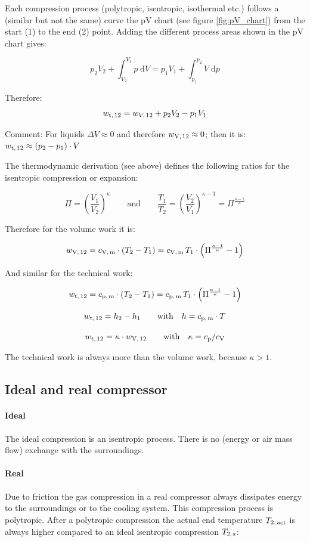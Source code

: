 \documentclass[11pt,a4paper,english,twoside]{scrreprt}
\begin{document}
Each compression process (polytropic, isentropic, isothermal etc.) follows a (similar but not the same) curve the pV chart (see figure \ref{fig:pV_chart}) from the start (1) to the end (2) point. Adding the different process areas shown in the pV chart gives:

\[p_2 V_2 +\int _{V_2}^{V_1}p\;  \mathrm{d}V=p_1 V_1 +\int _{p_1}^{p_2}V\;  \mathrm{d}p\]


Therefore:
\[w_\text{t,\,12} =w_{V,\,12} +p_2 V_2 -p_1 V_1\]

Comment: For liquids $\Delta V\approx 0$ and therefore $w_\text{V,\,12} \approx 0$; then it is:
$w_\text{t,\,12} \approx (p_2 -p_1)\cdot V$

The thermodynamic derivation (see above) defines the following ratios for the isentropic compression or expansion:

\[\Pi =\left(\frac{V_1}{V_2} \right)^{\kappa }\qquad \mbox{and} \qquad
\frac{T_1 }{T_2} =\left(\frac{V_2}{V_1} \right)^{\kappa -1} =\Pi ^{\frac{\kappa -1}{\kappa } } \]


Therefore for the volume work it is:

\[w_\text{V,\,12} =c_\text{V,\,m} \cdot (T_2 -T_1)=c_\text{V,\,m} \, T_1 \cdot \left(\Pi ^{\frac{\kappa -1}{\kappa } } -1\right)\]


And similar for the technical work:

\[w_\text{t,\,12} =c_\text{p,\,m} \cdot (T_2 -T_1 )=c_\text{p,\,m} \, T_1 \cdot \left(\Pi ^{\frac{\kappa -1}{\kappa } } -1\right)\]

\[w_\text{t,\,12} =h_2 - h_1 \qquad \mbox{with} \quad h=c_\text{p,\,m} \cdot T \]

\[w_\text{t,\,12} =\kappa \cdot w_\text{V,\,12} \qquad \mbox{with} \quad
\kappa = c_\text{p} / c_\text{V} \]


The technical work is always more than the volume work, because $\kappa >1$.

\subsection{Ideal and real compressor}

\paragraph{Ideal}
The ideal compression is an isentropic process. There is no (energy or air mass flow) exchange with the surroundings.


\paragraph{Real}
Due to friction the gas compression in a real compressor always dissipates energy to the surroundings or to the cooling system. This compression process is polytropic. After a polytropic compression the actual end temperature $T_\text{2,\,act}$ is always higher compared to an ideal isentropic compression $T_\text{2,\,s}$:
\end{document}

